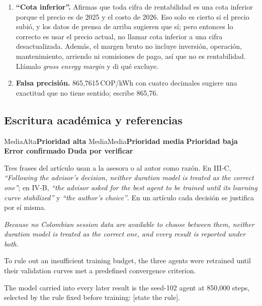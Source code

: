 \documentclass[11pt]{article}
\newcommand{\prioridad}[1]{%
  \def\tmpA{Alta}\def\tmpM{Media}\def\tmp{#1}%
  \ifx\tmp\tmpA\colorbox{rojoerror}{\color{white}\small\bfseries Prioridad alta}%
  \else\ifx\tmp\tmpM\colorbox{naranjatarea}{\color{white}\small\bfseries Prioridad media}%
  \else\colorbox{azulidea}{\color{white}\small\bfseries Prioridad baja}\fi\fi}
\newcommand{\confirmado}{\colorbox{rojoerror!15}{\small\bfseries\color{rojoerror} Error confirmado}}
\newcommand{\pordudar}{\colorbox{black!10}{\small\bfseries\color{black!75} Duda por verificar}}
\newenvironment{eng}{\begin{otherlanguage}{english}\itshape}{\end{otherlanguage}}
\begin{document}
\begin{duda}
\begin{enumerate}[leftmargin=1.5em]
\item \textbf{``Cota inferior''.} Afirmas que toda cifra de rentabilidad es una cota inferior porque el precio es de 2025 y el costo de 2026. Eso solo es cierto si el precio subió, y los datos de prensa de arriba sugieren que sí; pero entonces lo correcto es usar el precio actual, no llamar cota inferior a una cifra desactualizada. Además, el margen bruto no incluye inversión, operación, mantenimiento, arriendo ni comisiones de pago, así que no es rentabilidad. Llámalo \foreignlanguage{english}{\emph{gross energy margin}} y di qué excluye.
\item \textbf{Falsa precisión.} 865,7615\,COP/kWh con cuatro decimales sugiere una exactitud que no tiene sentido; escribe 865,76.
\end{enumerate}
\end{duda}

\subsection{Escritura académica y referencias}
\prioridad{Media} \confirmado{} \pordudar

\begin{error}
Tres frases del artículo usan a la asesora o al autor como razón. En III-C, \foreignlanguage{english}{\emph{``Following the advisor's decision, neither duration model is treated as the correct one''}}; en IV-B, \foreignlanguage{english}{\emph{``the advisor asked for the best agent to be trained until its learning curve stabilized''}} y \foreignlanguage{english}{\emph{``the author's choice''}}. En un artículo cada decisión se justifica por sí misma.
\end{error}

\begin{ejemplo}
\begin{eng}
Because no Colombian session data are available to choose between them, neither duration model is treated as the correct one, and every result is reported under both.

To rule out an insufficient training budget, the three agents were retrained until their validation curves met a predefined convergence criterion.

The model carried into every later result is the seed-102 agent at 850,000 steps, selected by the rule fixed before training: [state the rule].
\end{eng}
\end{ejemplo}
\end{document}
